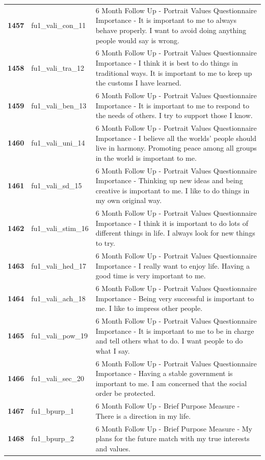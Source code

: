 \documentclass[
  letterpaper,
  DIV=11,
  numbers=noendperiod]{scrartcl}
\begin{document}
\begin{longtable}[t]{>{}cll}
\textbf{1457} & fu1\_vali\_con\_11 & 6 Month Follow Up - Portrait Values Questionnaire Importance - It is important to me to always behave properly. I want to avoid doing anything people would say is wrong.\\
\textbf{1458} & fu1\_vali\_tra\_12 & 6 Month Follow Up - Portrait Values Questionnaire Importance - I think it is best to do things in traditional ways. It is important to me to keep up the customs I have learned.\\
\textbf{1459} & fu1\_vali\_ben\_13 & 6 Month Follow Up - Portrait Values Questionnaire Importance - It is important to me to respond to the needs of others. I try to support those I know.\\
\textbf{1460} & fu1\_vali\_uni\_14 & 6 Month Follow Up - Portrait Values Questionnaire Importance - I believe all the worlds' people should live in harmony. Promoting peace among all groups in the world is important to me.\\
\addlinespace
\textbf{1461} & fu1\_vali\_sd\_15 & 6 Month Follow Up - Portrait Values Questionnaire Importance - Thinking up new ideas and being creative is important to me. I like to do things in my own original way.\\
\textbf{1462} & fu1\_vali\_stim\_16 & 6 Month Follow Up - Portrait Values Questionnaire Importance - I think it is important to do lots of different things in life. I always look for new things to try.\\
\textbf{1463} & fu1\_vali\_hed\_17 & 6 Month Follow Up - Portrait Values Questionnaire Importance - I really want to enjoy life. Having a good time is very important to me.\\
\textbf{1464} & fu1\_vali\_ach\_18 & 6 Month Follow Up - Portrait Values Questionnaire Importance - Being very successful is important to me. I like to impress other people.\\
\textbf{1465} & fu1\_vali\_pow\_19 & 6 Month Follow Up - Portrait Values Questionnaire Importance - It is important to me to be in charge and tell others what to do. I want people to do what I say.\\
\addlinespace
\textbf{1466} & fu1\_vali\_sec\_20 & 6 Month Follow Up - Portrait Values Questionnaire Importance - Having a stable government is important to me. I am concerned that the social order be protected.\\
\textbf{1467} & fu1\_bpurp\_1 & 6 Month Follow Up - Brief Purpose Measure - There is a direction in my life.\\
\textbf{1468} & fu1\_bpurp\_2 & 6 Month Follow Up - Brief Purpose Measure - My plans for the future match with my true interests and values.\\

\end{longtable}
\end{document}
